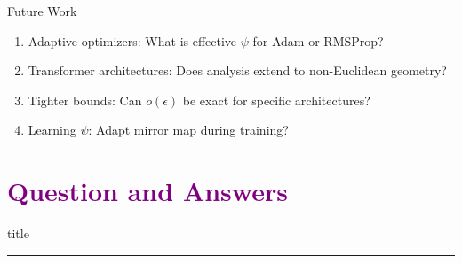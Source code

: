 \documentclass[aspectratio=169]{beamer}
\begin{document}
\begin{frame}{Future Work}
    \vspace{-0.2cm}
    \begin{enumerate}
        \item Adaptive optimizers: What is effective $\psi$ for Adam or RMSProp?
        \vspace{0.2cm}
        
        \item Transformer architectures: Does analysis extend to non-Euclidean geometry?
        \vspace{0.2cm}
        
        \item Tighter bounds: Can $o(\epsilon)$ be exact for specific architectures?
        \vspace{0.2cm}
        
        \item Learning $\psi$: Adapt mirror map during training?
    \end{enumerate}
\end{frame}

\section{\textbf{\textcolor{purple}{Question and Answers}}}
\begin{frame}[plain]
    \vfill
    \centering
    \begin{beamercolorbox}[sep=8pt,center,shadow=true,rounded=true]{title}
        \insertsectionhead\par%
        \color{oxfordblue}\noindent\rule{10cm}{1pt}
    \end{beamercolorbox}
    \vfill
\end{frame}
\end{document}
